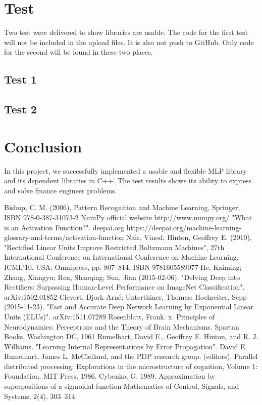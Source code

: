 \documentclass[a4paper]{article}
\begin{document}
\section{Test}
Two test were delivered to show libraries are usable. The code for the first test will not be included in the upload files. It is also not push to GitHub. Only code for the second will be found in these two places. 
\subsection{Test 1}


\subsection{Test 2}


\section{Conclusion}
In this project, we successfully implemented a usable and flexible MLP library and its dependent libraries in C++. The test results shows its ability to express and solve finance engineer problems. 








\newpage
\begin{thebibliography}{9}
 Bishop, C. M. (2006), Pattern Recognition and Machine Learning, Springer, ISBN 978-0-387-31073-2
 NumPy official website http://www.numpy.org/
 "What is an Activation Function?". deepai.org https://deepai.org/machine-learning-glossary-and-terms/activation-function
 Nair, Vinod; Hinton, Geoffrey E. (2010), "Rectified Linear Units Improve Restricted Boltzmann Machines", 27th International Conference on International Conference on Machine Learning, ICML'10, USA: Omnipress, pp. 807–814, ISBN 9781605589077
  He, Kaiming; Zhang, Xiangyu; Ren, Shaoqing; Sun, Jian (2015-02-06). "Delving Deep into Rectifiers: Surpassing Human-Level Performance on ImageNet Classification". arXiv:1502.01852 
 Clevert, Djork-Arné; Unterthiner, Thomas; Hochreiter, Sepp (2015-11-23). "Fast and Accurate Deep Network Learning by Exponential Linear Units (ELUs)". arXiv:1511.07289
 Rosenblatt, Frank. x. Principles of Neurodynamics: Perceptrons and the Theory of Brain Mechanisms. Spartan Books, Washington DC, 1961
 Rumelhart, David E., Geoffrey E. Hinton, and R. J. Williams. "Learning Internal Representations by Error Propagation". David E. Rumelhart, James L. McClelland, and the PDP research group. (editors), Parallel distributed processing: Explorations in the microstructure of cognition, Volume 1: Foundation. MIT Press, 1986.
 Cybenko, G. 1989. Approximation by superpositions of a sigmoidal function Mathematics of Control, Signals, and Systems, 2(4), 303–314.
\end{thebibliography}
\end{document}
